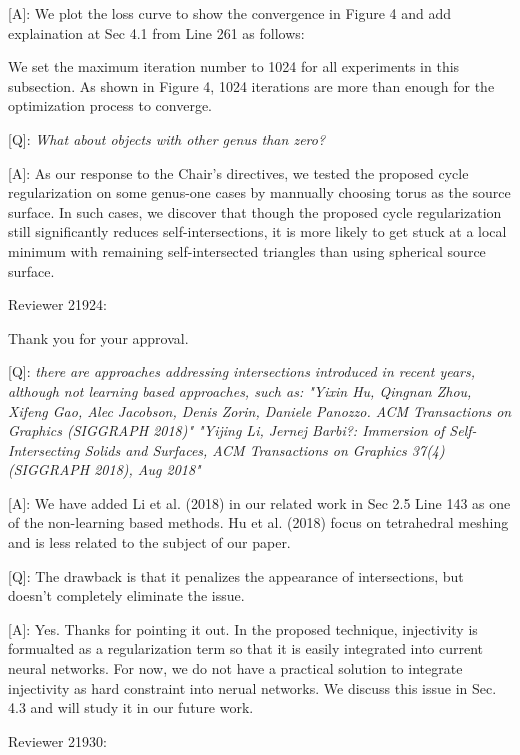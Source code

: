 \documentclass[10pt]{letter} %
\newcommand{\mdf}[1]{\textcolor[rgb]{1.00,0.00,1.00}{#1}}
\begin{document}
	[A]: We plot the loss curve to show the convergence in Figure 4 and add explaination at Sec 4.1 from Line 261 as follows:
	
	\mdf{We set the maximum iteration number to 1024 for all experiments in this subsection. As shown in Figure 4, 1024 iterations are more than enough for the optimization process to converge.}
	
	[Q]: \emph{What about objects with other genus than zero?}
	
	[A]: As our response to the Chair's directives, we tested the proposed cycle regularization on some genus-one cases by mannually choosing torus as the source surface. In such cases, we discover that though the proposed cycle regularization still significantly reduces self-intersections, it is more likely to get stuck at a local minimum with remaining self-intersected triangles than using spherical source surface.   
	 
	\hdashrule{\linewidth}{1pt}{1mm}
	Reviewer 21924:
	
	Thank you for your approval.
	
	[Q]: \emph{there are approaches addressing intersections introduced in recent years, although not learning based approaches, such as:
	"Yixin Hu, Qingnan Zhou, Xifeng Gao, Alec Jacobson, Denis Zorin, Daniele Panozzo. ACM Transactions on Graphics (SIGGRAPH 2018)"
	"Yijing Li, Jernej Barbi?: Immersion of Self-Intersecting Solids and Surfaces, ACM Transactions on Graphics 37(4) (SIGGRAPH 2018), Aug 2018"}
	
	[A]: We have added Li et al. (2018) in our related work in Sec 2.5 Line 143 as one of the non-learning based methods. Hu et al. (2018) focus on tetrahedral meshing and is less related to the subject of our paper.
	
	[Q]: The drawback is that it penalizes the appearance of intersections, but doesn't completely eliminate the issue.
	
	[A]: Yes. Thanks for pointing it out. In the proposed technique, injectivity is formualted as a regularization term so that it is easily integrated into current neural networks. For now, we do not have a practical solution to integrate injectivity as hard constraint into nerual networks. We discuss this issue in Sec. 4.3 and will study it in our future work. 
	
	\hdashrule{\linewidth}{1pt}{1mm}
	Reviewer 21930:
	
\end{document}
